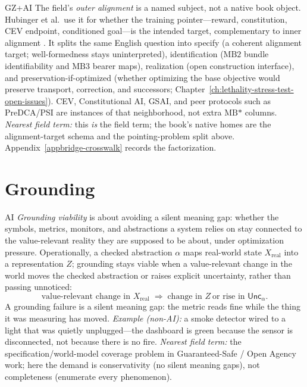 \begin{authbar}{GZ+AI}
\label{gloss:outer-alignment}\label{sec:outer-alignment}The field's \emph{outer alignment} is a named subject, not a native book object.
Hubinger et al.\ use it for whether the training pointer---reward, constitution, CEV endpoint, conditioned goal---is the intended target, complementary to inner alignment \autocite{hubinger2019risks}.
It splits the same English question into specify (a coherent alignment target; well-formedness stays uninterpreted), identification (\(\text{MB2}\) bundle identifiability and \(\text{MB3}\) bearer maps), realization (open construction interface), and preservation-if-optimized (whether optimizing the base objective would preserve transport, correction, and successors; Chapter~\ref{ch:lethality-stress-test-open-issues}).
CEV, Constitutional AI, GSAI, and peer protocols such as PreDCA/PSI are instances of that neighborhood, not extra \(\text{MB*}\) columns.
\emph{Nearest field term:} this \emph{is} the field term; the book's native homes are the alignment-target schema and the pointing-problem split above.
Appendix~\ref{appbridge-crosswalk} records the factorization.

\end{authbar}
\authbarneedspace
\section*{Grounding}
\begin{authbar}{AI}
\emph{Grounding viability} is about avoiding a silent meaning gap: whether the symbols, metrics, monitors, and abstractions a system relies on stay connected to the value-relevant reality they are supposed to be about, under optimization pressure.
Operationally, a checked abstraction \(\alpha\) maps real-world state \(X_{\mathrm{real}}\) into a representation \(Z\); grounding stays viable when a value-relevant change in the world moves the checked abstraction or raises explicit uncertainty, rather than passing unnoticed:
\[
\text{value-relevant change in } X_{\mathrm{real}}
\;\Rightarrow\;
\text{change in } Z \ \text{or rise in } \mathsf{Unc}_\alpha .
\]
A grounding failure is a silent meaning gap: the metric reads fine while the thing it was measuring has moved.
\emph{Example (non-AI):} a smoke detector wired to a light that was quietly unplugged---the dashboard is green because the sensor is disconnected, not because there is no fire.
\emph{Nearest field term:} the specification/world-model coverage problem in Guaranteed-Safe / Open Agency work; here the demand is conservativity (no silent meaning gaps), not completeness (enumerate every phenomenon).

\end{authbar}
\authbarneedspace
